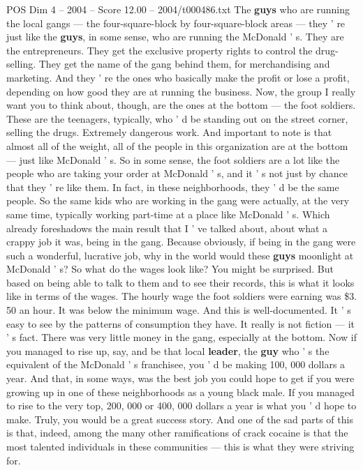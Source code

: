 \begin{textsample}{POS Dim 4 – 2004 – Score 12.00 – 2004/t000486.txt}
The \textbf{guys} who are running the local gangs — the four-square-block by four-square-block areas — they ' re just like the \textbf{guys}, in some sense, who are running the McDonald ' s.
They are the entrepreneurs.
They get the exclusive property rights to control the drug-selling.
They get the name of the gang behind them, for merchandising and marketing.
And they ' re the ones who basically make the profit or lose a profit, depending on how good they are at running the business.
Now, the group I really want you to think about, though, are the ones at the bottom — the foot soldiers.
These are the teenagers, typically, who ' d be standing out on the street corner, selling the drugs.
Extremely dangerous work.
And important to note is that almost all of the weight, all of the people in this organization are at the bottom — just like McDonald ' s.
So in some sense, the foot soldiers are a lot like the people who are taking your order at McDonald ' s, and it ' s not just by chance that they ' re like them.
In fact, in these neighborhoods, they ' d be the same people.
So the same kids who are working in the gang were actually, at the very same time, typically working part-time at a place like McDonald ' s.
Which already foreshadows the main result that I ' ve talked about, about what a crappy job it was, being in the gang.
Because obviously, if being in the gang were such a wonderful, lucrative job, why in the world would these \textbf{guys} moonlight at McDonald ' s?
So what do the wages look like?
You might be surprised.
But based on being able to talk to them and to see their records, this is what it looks like in terms of the wages.
The hourly wage the foot soldiers were earning was \$3. 50 an hour.
It was below the minimum wage.
And this is well-documented.
It ' s easy to see by the patterns of consumption they have.
It really is not fiction — it ' s fact.
There was very little money in the gang, especially at the bottom.
Now if you managed to rise up, say, and be that local \textbf{leader}, the \textbf{guy} who ' s the equivalent of the McDonald ' s franchisee, you ' d be making 100, 000 dollars a year.
And that, in some ways, was the best job you could hope to get if you were growing up in one of these neighborhoods as a young black male.
If you managed to rise to the very top, 200, 000 or 400, 000 dollars a year is what you ' d hope to make.
Truly, you would be a great success story.
And one of the sad parts of this is that, indeed, among the many other ramifications of crack cocaine is that the most talented individuals in these communities — this is what they were striving for.

\end{textsample}
